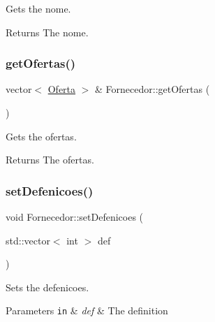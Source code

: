 Gets the nome. 

\begin{DoxyReturn}{Returns}
The nome. 
\end{DoxyReturn}
\mbox{\label{classFornecedor_a7ef7f5f79e2c61aaca5d60c06b2a0051}} 
\subsubsection{\texorpdfstring{get\+Ofertas()}{getOfertas()}}
{\footnotesize\ttfamily vector$<$ \hyperlink{classOferta}{Oferta} $>$ \& Fornecedor\+::get\+Ofertas (\begin{DoxyParamCaption}{ }\end{DoxyParamCaption})}



Gets the ofertas. 

\begin{DoxyReturn}{Returns}
The ofertas. 
\end{DoxyReturn}
\mbox{\label{classFornecedor_a63bb5795c45d195995de437620503d98}} 
\subsubsection{\texorpdfstring{set\+Defenicoes()}{setDefenicoes()}}
{\footnotesize\ttfamily void Fornecedor\+::set\+Defenicoes (\begin{DoxyParamCaption}\item[{std\+::vector$<$ int $>$}]{def }\end{DoxyParamCaption})\hspace{0.3cm}{\ttfamily [inline]}}



Sets the defenicoes. 


\begin{DoxyParams}[1]{Parameters}
\mbox{\tt in}  & {\em def} & The definition \\
\hline
\end{DoxyParams}
\mbox{\label{classFornecedor_a0a0945cbd2fd120d9eab5d5aec441b72}} 
